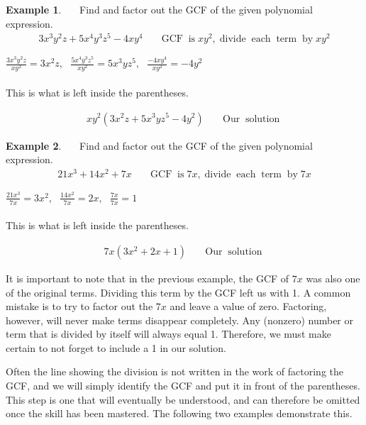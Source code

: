 \documentclass[12pt]{book}
\theoremstyle{definition}
\newtheorem{example}{Example}
\newcommand{\tmop}[1]{\ensuremath{\operatorname{#1}}}
\begin{document}
\begin{example}~~~Find and factor out the GCF of the given polynomial expression.
  \begin{eqnarray*}
    3 x^3 y^2 z + 5 x^4 y^3 z^5 - 4 x y^4 &  & \tmop{GCF} \tmop{is} x y^2,
    \tmop{divide} \tmop{each} \tmop{term} \tmop{by} xy^2
    \end{eqnarray*}
		\begin{center}
		$\displaystyle\frac{3 x^3 y^2 z}{x y^2} = 3 x^2 z,~~~ \displaystyle\frac{5 x^4 y^3 z^5}{x y^2} =
    5 x^3 y z^5,~~~ \displaystyle\frac{- 4 x y^4}{x y^2} = - 4 y^2$\\
		~\\
		This is what is left inside the parentheses.
		\end{center}
    \begin{eqnarray*}
    x y^2 (3 x^2 z + 5 x^3 y z^5 - 4 y^2) &  & \tmop{Our} \tmop{solution}
  \end{eqnarray*}
\end{example}
\begin{example}~~~Find and factor out the GCF of the given polynomial expression.
  \begin{eqnarray*}
    21 x^3 + 14 x^2 + 7 x &  & \tmop{GCF} \tmop{is} 7 x, \tmop{divide}
    \tmop{each} \tmop{term} \tmop{by} 7x
    \end{eqnarray*}
		\begin{center}
    $\displaystyle\frac{21 x^3}{7 x} = 3 x^2,~~~ \displaystyle\frac{14 x^2}{7 x} = 2 x,~~~ \displaystyle\frac{7 x}{7 x} = 1$\\
		~\\
		This is what is left inside the parentheses.
		\end{center}
  \begin{eqnarray*}
    7 x (3 x^2 + 2 x + 1) &  & \tmop{Our} \tmop{solution}
  \end{eqnarray*}
\end{example}

It is important to note that in the previous example, the GCF of $7 x$
was also one of the original terms.  Dividing this term by the GCF left us with 1. A common mistake is to try to factor out the $7 x$ and leave a value of zero.  Factoring, however, will never make terms disappear completely.  Any (nonzero) number or term that is divided by itself will always equal 1.  Therefore, we must make certain to not forget to include a 1 in our solution.\par
Often the line showing the division is not written in the work of factoring the GCF, and we will simply identify the GCF and put it in front of the parentheses.  This step is one that will eventually be understood, and can therefore be omitted once the skill has been mastered.  The following two examples demonstrate this.
\end{document}
